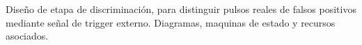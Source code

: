 Diseño de etapa de discriminación, para distinguir pulsos reales de falsos positivos mediante señal de trigger externo. Diagramas, maquinas de estado y recursos asociados.